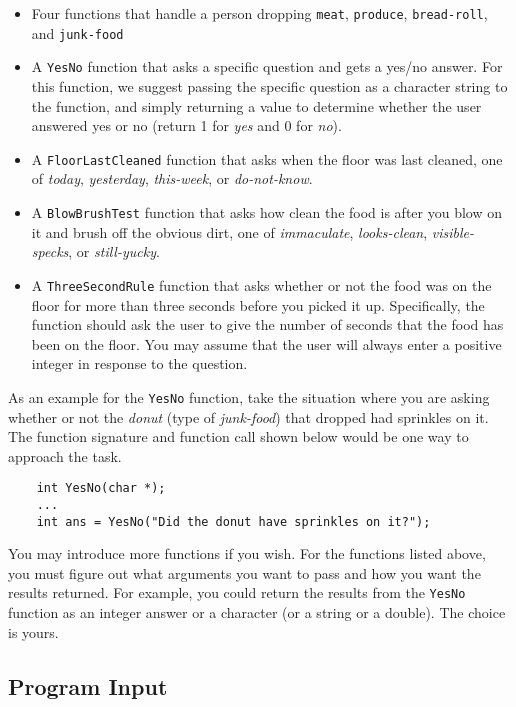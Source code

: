 \documentclass[12pt]{article}
\begin{document}
\begin{itemize}
\item Four functions that handle a person dropping {\tt meat}, {\tt produce},
{\tt bread-roll}, and {\tt junk-food}
\item A {\tt YesNo} function that asks a specific question and gets a yes/no answer.
For this function, we suggest passing the specific question as a character string
to the function, and simply returning a value to determine whether the user answered
yes or no (return 1 for {\it yes} and 0 for {\it no}).
\item A {\tt FloorLastCleaned} function that asks when the floor was last cleaned, 
one of {\it today}, {\it yesterday}, {\it this-week}, or {\it do-not-know}.
\item A {\tt BlowBrushTest} function that asks how clean the food is after you
blow on it and brush off the obvious dirt, one of {\it immaculate}, {\it looks-clean},
{\it visible-specks}, or {\it still-yucky}.
\item A {\tt ThreeSecondRule} function that asks whether or not the food was on
the floor for more than three seconds before you picked it up.  Specifically, the
function should ask the user to give the number of seconds that the food has been on
the floor.  You may assume that the user will always enter a positive integer in
response to the question.  
\end{itemize}

As an example for the {\tt YesNo} function, take the situation where you are asking
whether or not the {\it donut} (type of {\it junk-food}) that dropped had sprinkles on it.
The function signature and function call shown below would be one way to approach the task.

\begin{verbatim}
    int YesNo(char *);
    ...
    int ans = YesNo("Did the donut have sprinkles on it?");
\end{verbatim}

You may introduce more functions if you wish.  For the functions listed above,
you must figure out what arguments you want to pass and how you want the results
returned.  For example, you could return the results from the {\tt YesNo} function as
an integer answer or a character (or a string or a double).  The choice is yours.

\subsection*{Program Input}
\end{document}

